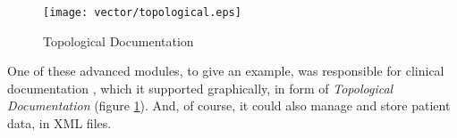 \begin{figure}[ht]
    \begin{center}
        \texttt{[image: vector/topological.eps]}
        \caption{Topological Documentation}
        \label{topological_figure}
    \end{center}
\end{figure}

One of these advanced modules, to give an example, was responsible for clinical
documentation \cite{hellerbohl}, which it supported graphically, in form of
\emph{Topological Documentation} (figure \ref{topological_figure}). And, of
course, it could also manage and store patient data, in XML files.
